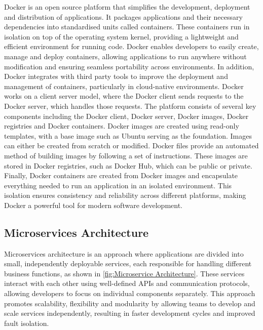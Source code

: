 Docker is an open source platform that simplifies the development, deployment and distribution of applications. It packages applications and their necessary dependencies into standardised units called containers. These containers run in isolation on top of the operating system kernel, providing a lightweight and efficient environment for running code. Docker enables developers to easily create, manage and deploy containers, allowing applications to run anywhere without modification and ensuring seamless portability across environments. In addition, Docker integrates with third party tools to improve the deployment and management of containers, particularly in cloud-native environments. Docker works on a client server model, where the Docker client sends requests to the Docker server, which handles those requests. The platform consists of several key components including the Docker client, Docker server, Docker images, Docker registries and Docker containers. Docker images are created using read-only templates, with a base image such as Ubuntu serving as the foundation. Images can either be created from scratch or modified. Docker files provide an automated method of building images by following a set of instructions. These images are stored in Docker registries, such as Docker Hub, which can be public or private. Finally, Docker containers are created from Docker images and encapsulate everything needed to run an application in an isolated environment. This isolation ensures consistency and reliability across different platforms, making Docker a powerful tool for modern software development. \cite{rad2017introduction}

\subsection{Microservices Architecture}

Microservices architecture is an approach where applications are divided into small, independently deployable services, each responsible for handling different business functions, as shown in \autoref{fig:Microservice Architecture}. These services interact with each other using well-defined APIs and communication protocols, allowing developers to focus on individual components separately. This approach promotes scalability, flexibility and modularity by allowing teams to develop and scale services independently, resulting in faster development cycles and improved fault isolation. \cite{r22}

\clearpage

